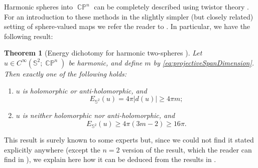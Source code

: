 \documentclass[11pt]{article}
\theoremstyle{plain}
\numberwithin{equation}{section}
\newtheorem{theorem}{Theorem}[section]
\theoremstyle{definition}
\def \mb{\mathbb}
\DeclareMathOperator{\CP}{\mathbb{CP}}
\begin{document}
Harmonic spheres into $\CP^n$ can be completely described using twistor theory \cite{EellsWood1983}. For an introduction to these methods in the slightly simpler (but closely related) setting of sphere-valued maps we refer the reader to \cite[\S 6]{Helein2002}.  In particular, we have the following result:

\begin{theorem}[Energy dichotomy for harmonic two-spheres \cite{EellsWood1983}]
    \label{thm:harmonicSphereDichotomyCPn}
Let $u\in C^\infty(\mb S^2;\CP^n)$ be harmonic, and define $m$ by
\eqref{eq:projectiveSpanDimension}.  Then exactly one of the following
holds:
\begin{enumerate}
    \item $u$ is holomorphic or anti-holomorphic, and
    \[
        E_{\mb S^2}(u)=4\pi|d(u)|\geq4\pi m;
    \]
    \item $u$ is neither holomorphic nor anti-holomorphic, and
    \[
        E_{\mb S^2}(u)\geq4\pi(3m-2)\geq16\pi.
    \]
\end{enumerate}
\end{theorem}

This result is surely known to some experts but, since we could not find it stated explicitly anywhere (except the $n=2$ version of the result, which the reader can find in \cite[Corollary 2.3]{Lemaire2002}), we explain here how it can be deduced from the results in \cite{EellsWood1983}.
\end{document}
